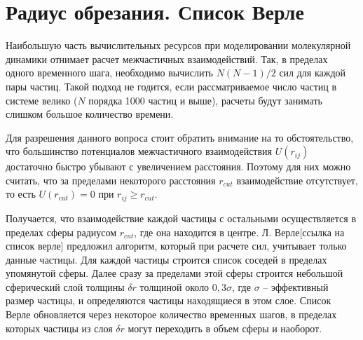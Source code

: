 \section{Радиус обрезания. Список Верле}
Наибольшую часть вычислительных ресурсов при моделировании молекулярной динамики отнимает расчет межчастичных взаимодействий. Так, в пределах одного временного шага, необходимо вычислить $N(N-1)/2$ сил для каждой пары частиц. Такой подход не годится, если рассматриваемое число частиц в системе велико ($N$ порядка 1000 частиц и выше), расчеты будут занимать слишком большое количество времени.
\par Для разрешения данного вопроса стоит обратить внимание на то обстоятельство, что большинство потенциалов межчастичного взаимодействия $U(r_{ij})$ достаточно быстро убывают с увеличением расстояния. Поэтому для них можно считать, что за пределами некоторого расстояния $r_{cut}$ взаимодействие отсутствует, то есть $U(r_{cut}) = 0$ при $r_{ij}\geq r_{cut}$.
\par Получается, что взаимодействие каждой частицы с остальными осуществляется в пределах сферы радиусом $r_{cut}$, где она находится в центре. Л. Верле[ссылка на список верле] предложил алгоритм, который при расчете сил, учитывает только данные частицы. Для каждой частицы строится список соседей в пределах упомянутой сферы. Далее сразу за пределами этой сферы строится небольшой сферический слой толщины $\delta r$ толщиной около $0,3\sigma$, где $\sigma$ -- эффективный размер частицы, и определяются частицы находящиеся в этом слое. Список Верле обновляется через некоторое количество временных шагов, в пределах которых частицы из слоя $\delta r$ могут переходить в объем сферы и наоборот.

